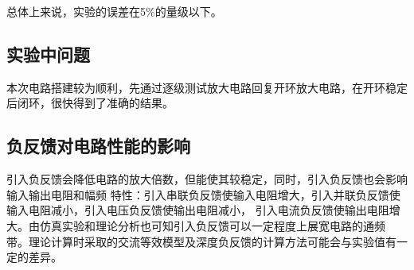 \documentclass[UTF8,a4paper]{article}
\begin{document}
总体上来说，实验的误差在5\%的量级以下。
\subsection{实验中问题}
本次电路搭建较为顺利，先通过逐级测试放大电路回复开环放大电路，在开环稳定后闭环，很快得到了准确的结果。

\subsection{负反馈对电路性能的影响}
引入负反馈会降低电路的放大倍数，但能使其较稳定，同时，引入负反馈也会影响输入输出电阻和幅频
特性：引入串联负反馈使输入电阻增大，引入并联负反馈使输入电阻减小，引入电压负反馈使输出电阻减小，
引入电流负反馈使输出电阻增大。由仿真实验和理论分析也可知引入负反馈可以一定程度上展宽电路的通频
带。理论计算时采取的交流等效模型及深度负反馈的计算方法可能会与实验值有一定的差异。
\end{document}

